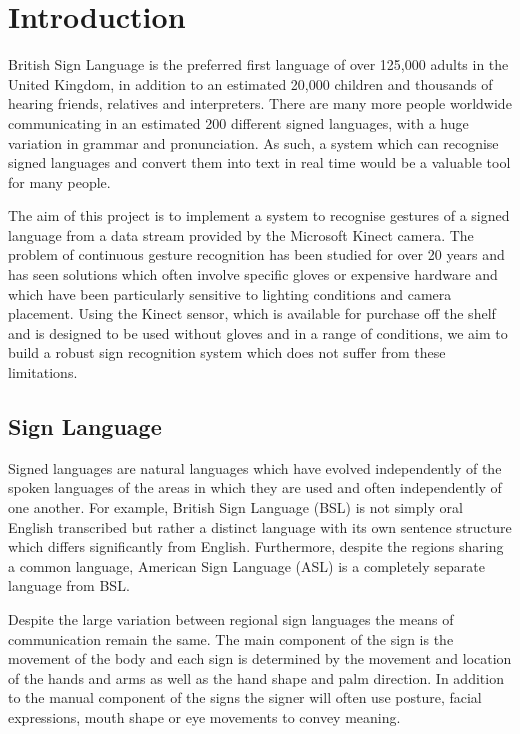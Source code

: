 \chapter{Introduction}
\ifpdf
    \graphicspath{{Introduction/IntroductionFigs/PNG/}{Introduction/IntroductionFigs/PDF/}{Introduction/IntroductionFigs/}}
\else
    \graphicspath{{Introduction/IntroductionFigs/EPS/}{Introduction/IntroductionFigs/}}
\fi

British Sign Language is the preferred first language of over 125,000 adults in the United Kingdom, in addition to an estimated 20,000 children and thousands of hearing friends, relatives and interpreters. There are many more people worldwide communicating in an estimated 200 different signed languages, with a huge variation in grammar and pronunciation. As such, a system which can recognise signed languages and convert them into text in real time would be a valuable tool for many people. 

The aim of this project is to implement a system to recognise gestures of a signed language from a data stream provided by the Microsoft Kinect camera. The problem of continuous gesture recognition has been studied for over 20 years and has seen solutions which often involve specific gloves or expensive hardware and which have been particularly sensitive to lighting conditions and camera placement. Using the Kinect sensor, which is available for purchase off the shelf and is designed to be used without gloves and in a range of conditions, we aim to build a robust sign recognition system which does not suffer from these limitations.

\section{Sign Language}
Signed languages are natural languages which have evolved independently of the spoken languages of the areas in which they are used and often independently of one another. For example, British Sign Language (BSL) is not simply oral English transcribed but rather a distinct language with its own sentence structure which differs significantly from English. Furthermore, despite the regions sharing a common language, American Sign Language (ASL) is a completely separate language from BSL.

Despite the large variation between regional sign languages the means of communication remain the same. The main component of the sign is the movement of the body and each sign is determined by the movement and location of the hands and arms as well as the hand shape and palm direction. In addition to the manual component of the signs the signer will often use posture, facial expressions, mouth shape or eye movements to convey meaning.

